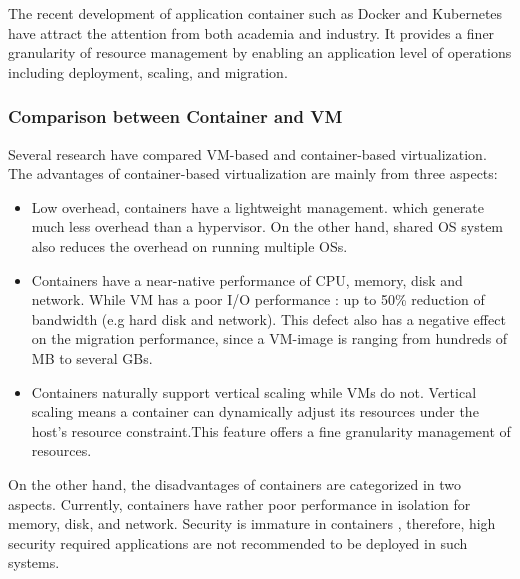 The recent development of application container such as Docker and Kubernetes \cite{Bernstein:2014ur} have attract the attention from both academia and industry. It provides a finer granularity of resource management by enabling an application level of operations including deployment, scaling, and migration.  



\subsubsection{Comparison between Container and VM}
Several research \cite{He:2012im, Felter:2015ki, Xavier:2013fy, Dua:2014bw} have compared VM-based and container-based virtualization. The advantages of container-based virtualization are mainly from three aspects:

\begin{itemize}
	\item Low overhead, containers have a lightweight management. which generate much less overhead than a hypervisor. On the other hand, shared OS system also reduces the overhead on running multiple OSs. 
	\item Containers have a near-native performance of CPU, memory, disk and network. While VM has a poor I/O performance \cite{Shafer:2010vh}: up to 50\% reduction of bandwidth (e.g hard disk and network). This defect also has a negative effect on the migration performance, since a VM-image is ranging from hundreds of MB to several GBs. 
	\item Containers naturally support vertical scaling while VMs do not. Vertical scaling means a container can dynamically adjust its resources under the host's resource constraint.This feature offers a fine granularity management of resources. 
\end{itemize}
	
On the other hand, the disadvantages of containers are categorized in two aspects. Currently, containers have rather poor performance in isolation for memory, disk, and network. Security is immature in containers \cite{Bernstein:2014ur}, therefore, high security required applications are not recommended to be deployed in such systems.

